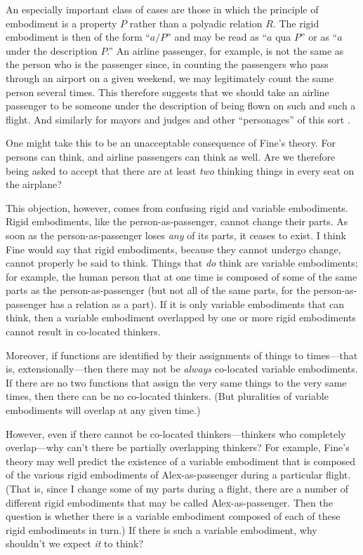 \documentclass[11pt]{article}
\newenvironment{squote}{%
\begin{spacing}{1}
\begin{list}{}{%
\setlength{\labelwidth}{0pt}%
\rightmargin\leftmargin%
}
\item\relax
}{%
\end{list}%
\end{spacing}
}
\begin{document}
\begin{spacing}{1.5}
\begin{squote}
An especially important class of cases are those in which the
principle of embodiment is a property $P$ rather than a polyadic
relation $R$.  The rigid embodiment is then of the form ``$a/P$'' and
may be read as ``$a$ qua $P$'' or as ``$a$ under the description
$P$.''  An airline passenger, for example, is not the same as the
person who is the passenger since, in counting the passengers who pass
through an airport on a given weekend, we may legitimately count the
same person several times.  This therefore suggests that we should
take an airline passenger to be someone under the description of being
flown on such and such a flight.  And similarly for mayors and judges
and other ``personages'' of this sort \citeyearpar[67--68]{fine1999}.
\end{squote}

One might take this to be an unacceptable consequence of Fine's
theory.  For persons can think, and airline passengers can think as
well.  Are we therefore being asked to accept that there are at least
{\em two} thinking things in every seat on the airplane?

This objection, however, comes from confusing rigid and variable
embodiments.  Rigid embodiments, like the person-as-passenger, cannot
change their parts.  As soon as the person-as-passenger loses {\em
  any} of its parts, it ceases to exist.  I think Fine would say that
rigid embodiments, because they cannot undergo change, cannot properly
be said to think.  Things that {\em do} think are variable
embodiments; for example, the human person that at one time is
composed of some of the same parts as the person-as-passenger (but not
all of the same parts, for the person-as-passenger has a relation as a
part).  If it is only variable embodiments that can think, then a
variable embodiment overlapped by one or more rigid embodiments cannot
result in co-located thinkers.

Moreover, if functions are identified by their assignments of things
to times---that is, extensionally---then there may not be {\em always}
co-located variable embodiments.  If there are no two functions that
assign the very same things to the very same times, then there can be
no co-located thinkers.  (But pluralities of variable embodiments will
overlap at any given time.)

However, even if there cannot be co-located thinkers---thinkers who
completely overlap---why can't there be partially overlapping
thinkers?  For example, Fine's theory may well predict the existence
of a variable embodiment that is composed of the various rigid
embodiments of Alex-as-passenger during a particular flight.  (That
is, since I change some of my parts during a flight, there are a
number of different rigid embodiments that may be called
Alex-as-passenger.  Then the question is whether there is a variable
embodiment composed of each of these rigid embodiments in turn.)  If
there is such a variable embodiment, why shouldn't we expect {\em it}
to think?


\end{spacing}
\end{document}
